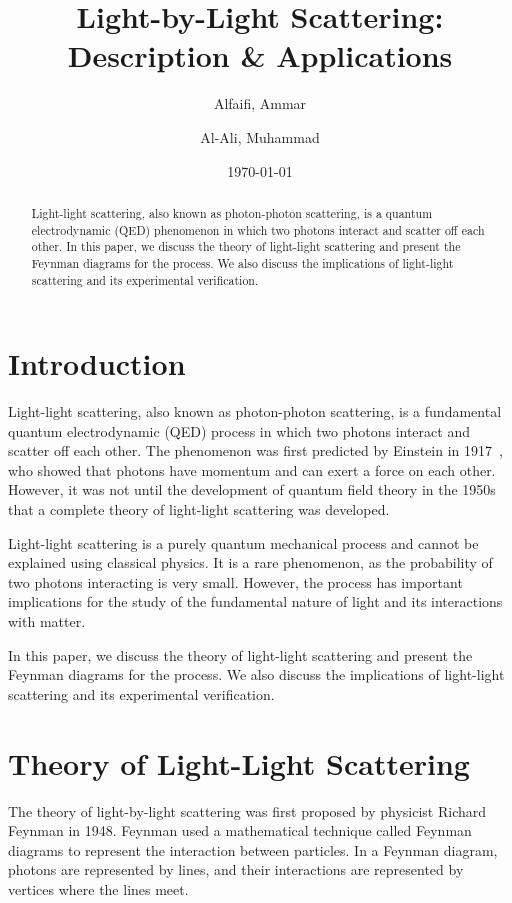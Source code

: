 \documentclass{paper}
\title{Light-by-Light Scattering: Description \& Applications}
\author{Alfaifi, Ammar \and Al-Ali, Muhammad}
\date{\today}
\begin{document}
\maketitle

\begin{abstract}
	Light-light scattering, also known as photon-photon scattering, is a quantum electrodynamic (QED) phenomenon in which two photons interact and scatter off each other. In this paper, we discuss the theory of light-light scattering and present the Feynman diagrams for the process. We also discuss the implications of light-light scattering and its experimental verification.
\end{abstract}

\section{Introduction}

Light-light scattering, also known as photon-photon scattering, is a fundamental quantum electrodynamic (QED) process in which two photons interact and scatter off each other. The phenomenon was first predicted by Einstein in 1917~\cite{einstein}, who showed that photons have momentum and can exert a force on each other. However, it was not until the development of quantum field theory in the 1950s that a complete theory of light-light scattering was developed.

Light-light scattering is a purely quantum mechanical process and cannot be explained using classical physics. It is a rare phenomenon, as the probability of two photons interacting is very small. However, the process has important implications for the study of the fundamental nature of light and its interactions with matter.

In this paper, we discuss the theory of light-light scattering and present the Feynman diagrams for the process. We also discuss the implications of light-light scattering and its experimental verification.

\section{Theory of Light-Light Scattering}

The theory of light-by-light scattering was first proposed by physicist Richard Feynman in 1948. Feynman used a mathematical technique called Feynman diagrams to represent the interaction between particles. In a Feynman diagram, photons are represented by lines, and their interactions are represented by vertices where the lines meet.
\end{document}
